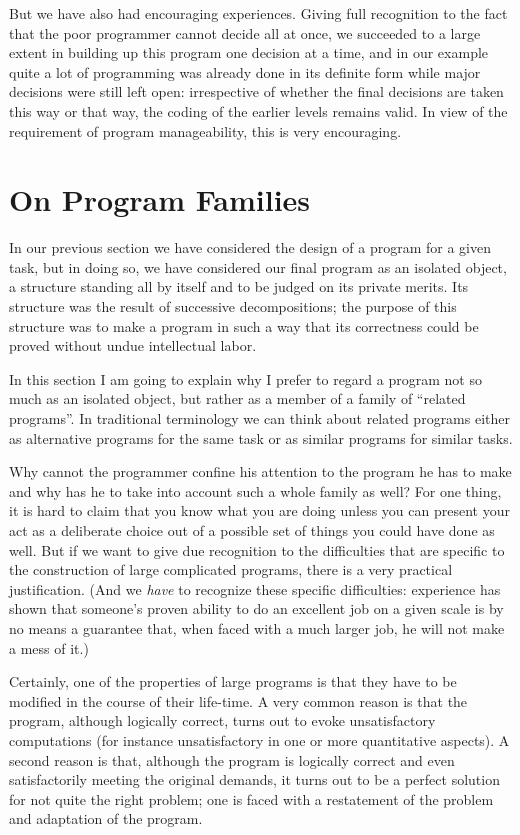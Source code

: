 But we have also had encouraging experiences. Giving full recognition to the fact that the poor programmer cannot decide all at once, we succeeded to a large extent in building up this program one decision at a time, and in our example quite a lot of programming was already done in its definite form while major decisions were still left open: irrespective of whether the final decisions are taken this way or that way, the coding of the earlier levels remains valid. In view of the requirement of program manageability, this is very encouraging.

\section[On program families]{On Program Families}

In our previous section we have considered the design of a program for a given task, but in doing so, we have considered our final program as an isolated object, a structure standing all by itself and to be judged on its private merits. Its structure was the result of successive decompositions; the purpose of this structure was to make a program in such a way that its correctness could be proved without undue intellectual labor.

In this section I am going to explain why I prefer to regard a program not so much as an isolated object, but rather as a member of a family of ``related programs''. In traditional terminology we can think about related programs either as alternative programs for the same task or as similar programs for similar tasks.

Why cannot the programmer confine his attention to the program he has to make and why has he to take into account such a whole family as well? For one thing, it is hard to claim that you know what you are doing unless you can present your act as a deliberate choice out of a possible set of things you could have done as well. But if we want to give due recognition to the difficulties that are specific to the construction of large complicated programs, there is a very practical justification. (And we \textit{have} to recognize these specific difficulties: experience has shown that someone's proven ability to do an excellent job on a given scale is by no means a guarantee that, when faced with a much larger job, he will not make a mess of it.)

Certainly, one of the properties of large programs is that they have to be modified in the course of their life-time. A very common reason is that the program, although logically correct, turns out to evoke unsatisfactory computations (for instance unsatisfactory in one or more quantitative aspects). A second reason is that, although the program is logically correct and even satisfactorily meeting the original demands, it turns out to be a perfect solution for not quite the right problem; one is faced with a restatement of the problem and adaptation of the program.

